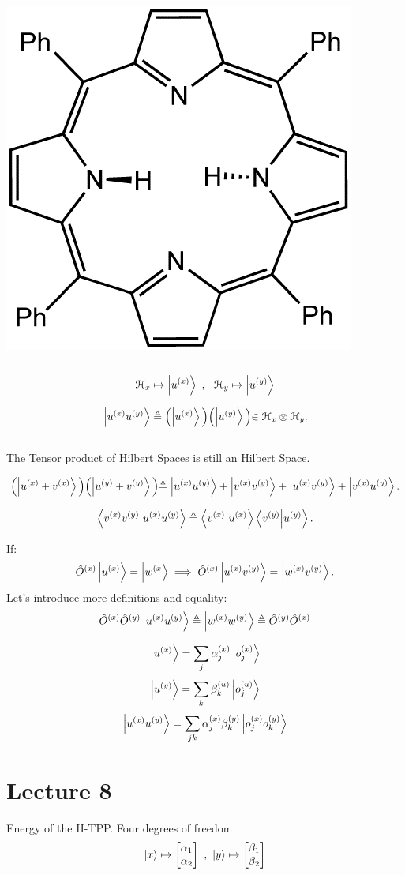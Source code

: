 \documentclass{article}
\begin{document}
\includegraphics[]{H2TPP.png}
\\ \\
$$\mathcal{H}_x \mapsto \ket{u^{(x)}} \ ,\ \ \mathcal{H}_y \mapsto \ket{u^{(y)}}$$

$$ \ket{u^{(x)}u^{(y)}} \triangleq \Bigl( \ket{u^{(x)}} \Bigl) \Bigl( \ket{u^{(y)}} \Bigl) \in \mathcal{H}_x \otimes \mathcal{H}_y.$$ \\
The Tensor product of Hilbert Spaces is still an Hilbert Space. 

$$ \Bigl( \ket{u^{(x)} + v^{(x)}} \Bigl) \Bigl( \ket{u^{(y)}+ v^{(y)}} \Bigl) \triangleq \ket{u^{(x)} u^{(y)}} + \ket{v^{(x)}v^{(y)}} + \ket{u^{(x)}v^{(y)}}+\ket{v^{(x)}u^{(y)}}.$$

$$\bra{v^{(x)} v^{(y)}} \ket{{u^{(x)}u^{(y)}}} \triangleq \bra{v^{(x)}}\ket{u^{(x)}} \bra{v^{(y)}}\ket{u^{(y)}}.$$

If: $$\hat{O}^{(x)} \ket{u^{(x)}} = \ket{w^{(x}} \implies \hat{O}^{(x)} \ket{u^{(x)}v^{(y)}} = \ket{w^{(x)}v^{(y)}}.$$
Let's introduce more definitions and equality:
$$\hat{O}^{(x)}\hat{O}^{(y)}\ket{u^{(x)}u^{(y)}} \triangleq \ket{w^{(x)}w^{(y)}} \triangleq \hat{O}^{(y)}\hat{O}^{(x)}$$

$$\ket{u^{(x)}} = \sum_j \alpha_j^{(x)} \ket{o_j^{(x)}}$$
$$\ket{u^{(y)}} = \sum_k \beta_k^{(u)} \ket{o_j^{(u)}} $$
$$\ket{u^{(x)}u^{(y)}} = \sum_{jk} \alpha_j^{(x)}\beta_k^{(y)} \ket{o_j^{(x)}o_k^{(y)}}$$

\section{ Lecture 8}
Energy of the H-TPP. Four degrees of freedom.
$$\ket{x} \mapsto \begin{bmatrix}
    \alpha_1 \\
    \alpha_2 \\
\end{bmatrix} \ , \ \ket{y} \mapsto \begin{bmatrix}
    \beta_1 \\
    \beta_2 \\
\end{bmatrix}$$
\end{document}
